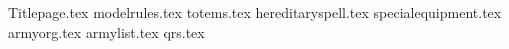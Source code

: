 \documentclass[a4paper,10pt]{article}
\begin{document}
{Titlepage.tex}
{modelrules.tex}
\newpage
{totems.tex}
\additionalspacebeforemaintitle{}
{hereditaryspell.tex}
\newpage
{specialequipment.tex}
\newpage
{armyorg.tex}
\additionalspacebeforemaintitle{}
{armylist.tex}
\newpage
{qrs.tex}
\end{document}
